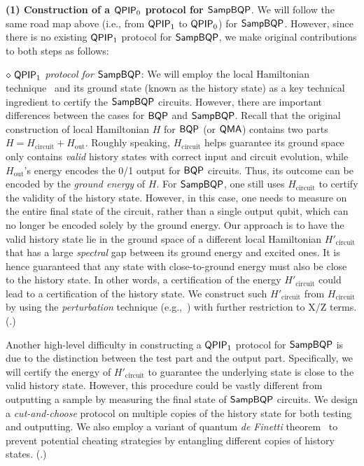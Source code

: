 \vspace{2mm} \noindent \textbf{(1) Construction of a $\operatorname{\mathsf{QPIP}}_0$ protocol for $\operatorname{\mathsf{SampBQP}}$}.
We will follow the same road map above (i.e., from $\operatorname{\mathsf{QPIP}}_1$ to $\operatorname{\mathsf{QPIP}}_0$) for $\operatorname{\mathsf{SampBQP}}$. However, since there is no existing $\operatorname{\mathsf{QPIP}}_1$ protocol for $\operatorname{\mathsf{SampBQP}}$, we make original contributions to both steps as follows:

\vspace{2mm} \noindent \emph{$\diamond \, \operatorname{\mathsf{QPIP}}_1$ protocol for $\operatorname{\mathsf{SampBQP}}$}: We will employ the local Hamiltonian technique~\cite{kitaev2002classical} and its ground state (known as the history state) as a key technical ingredient to certify the $\operatorname{\mathsf{SampBQP}}$ circuits.
However, there are important differences between the cases for $\operatorname{\mathsf{BQP}}$ and $\operatorname{\mathsf{SampBQP}}$.
Recall that the original construction of local Hamiltonian $H$ for $\operatorname{\mathsf{BQP}}$ (or $\operatorname{\mathsf{QMA}}$) contains two parts $H=H_{\mathrm{circuit}}+ H_{\mathrm{out}}$.
Roughly speaking, $H_{\mathrm{circuit}}$ helps guarantee its ground space only contains \emph{valid} history states with correct input and circuit evolution, while $H_{\mathrm{out}}$'s energy encodes the 0/1 output for $\operatorname{\mathsf{BQP}}$ circuits.
Thus, its outcome can be encoded by the \emph{ground energy} of $H$.
For $\operatorname{\mathsf{SampBQP}}$, one still uses $H_{\mathrm{circuit}}$ to certify the validity of the history state.
However, in this case, one needs to measure on the entire final state of the circuit, rather than a single output qubit,
which can no longer be encoded solely by the ground energy.
Our approach is to have the valid history state lie in the ground space of a different local Hamiltonian $H'_{\mathrm{circuit}}$  that has a large \emph{spectral} gap between its ground energy and excited ones.
It is hence guaranteed that any state with close-to-ground energy must also be close to the history state.
In other words, a certification of the energy $H'_{\mathrm{circuit}}$ could lead to a certification of the history state.
We construct such $H'_{\mathrm{circuit}}$ from $H_{\mathrm{circuit}}$ by using the \emph{perturbation} technique (e.g.,~\cite{kempe_kitaev_regev_2006}) with further restriction to X/Z terms. (.)


Another high-level difficulty in constructing a $\operatorname{\mathsf{QPIP}}_1$ protocol for $\operatorname{\mathsf{SampBQP}}$ is due to the distinction between the test part and the output part.
Specifically, we will certify the energy of $H'_{\mathrm{circuit}}$ to guarantee the underlying state is close to the valid history state.
However, this procedure could be vastly different from outputting a sample by measuring the final state of $\operatorname{\mathsf{SampBQP}}$ circuits.
We design a \emph{cut-and-choose} protocol on multiple copies of the history state for both testing and outputting.
We also employ a variant of quantum \emph{de Finetti} theorem~\cite{Brandao2017}
to prevent potential cheating strategies by entangling different copies of history states.
(.)

